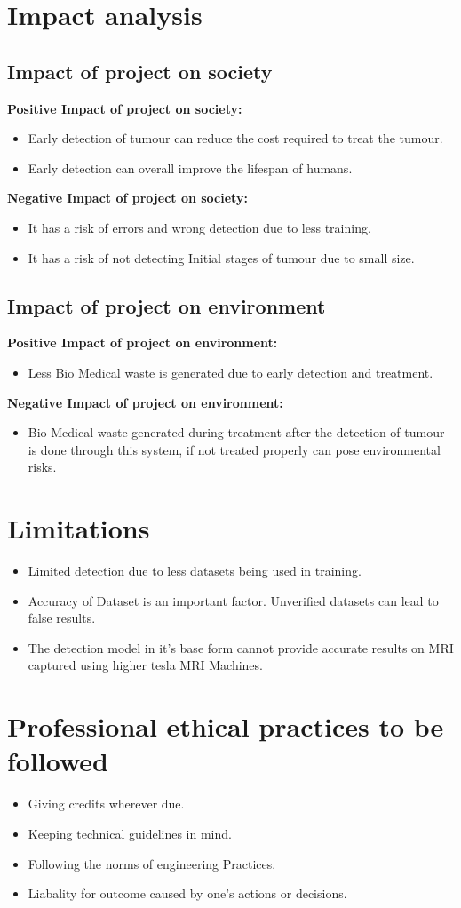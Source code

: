\section{Impact analysis}
\subsection{Impact of project on society}
{\textbf{Positive Impact of project on society:}} 
\begin{itemize}
    \item Early detection of tumour can reduce the cost required to treat the tumour.
    \item Early detection can overall improve the lifespan of humans.
\end{itemize}
{\textbf{Negative Impact of project on society:}}
\begin{itemize}
    \item It has a risk of errors and wrong detection due to less training.
    \item It has a risk of not detecting Initial stages of tumour due to small size.
\end{itemize}
\subsection{Impact of project on environment }
{\textbf{Positive Impact of project on environment: }}
\begin{itemize}
    \item Less Bio Medical waste is generated due to early detection and treatment.
\end{itemize} 
{\textbf{Negative Impact of project on environment: }}
\begin{itemize}
    \item Bio Medical waste generated during treatment after the detection of tumour is done through this system, if not treated properly can pose environmental risks.
\end{itemize}

\section{Limitations}
\begin{itemize}
    \item Limited detection due to less datasets being used in training.
    \item Accuracy of Dataset is an important factor. Unverified datasets can lead to false results.
    \item The detection model in it's base form cannot provide accurate results on MRI captured using higher tesla MRI Machines.
\end{itemize}

\section{Professional ethical practices to be followed}
\begin{itemize}
    \item Giving credits wherever due.
    \item Keeping technical guidelines in mind.
    \item Following the norms of engineering Practices.
    \item Liabality for outcome caused by one’s actions or decisions.
\end{itemize}
